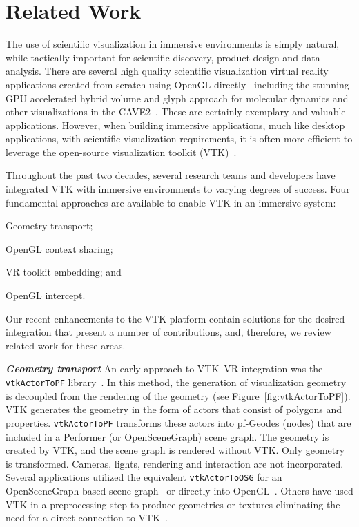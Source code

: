 \section{Related Work}

The use of scientific visualization in immersive environments is simply natural, while tactically important for scientific discovery, product design and data analysis.
There are several high quality scientific visualization virtual reality applications created from scratch using OpenGL directly~\cite{Billen:2008, LaViola:2007, Schulze:2001, Rantzau:1998} including the stunning GPU accelerated hybrid volume and glyph approach for molecular dynamics and other visualizations in the CAVE2~\cite{Reda:2013, Reda:2013a}.
These are certainly exemplary and valuable applications.
However, when building immersive applications, much like desktop applications, with scientific visualization requirements, it is often more efficient to leverage the open-source visualization toolkit (VTK)~\cite{Schroeder:2004}.

Throughout the past two decades, several research teams and developers have integrated VTK with immersive environments to varying degrees of success.
Four fundamental approaches are available to enable VTK in an immersive system:

\begin{compactitem}
\item Geometry transport;
\item OpenGL context sharing;
\item VR toolkit embedding; and
\item OpenGL intercept.
\end{compactitem}

Our recent enhancements to the VTK platform contain solutions for the desired integration that present a number of contributions, and, therefore, we review related work for these areas.

\textbf{\textit{Geometry transport}}
An early approach to VTK--VR integration was the \texttt{vtkActorToPF} library~\cite{Leigh98limbo/vtk}.
In this method, the generation of visualization geometry is decoupled from
the rendering of the geometry (see Figure~\ref{fig:vtkActorToPF}). 
VTK generates the geometry in the form of actors that consist of polygons and properties.
\texttt{vtkActorToPF} transforms these actors into pf-Geodes (nodes) that are included in a Performer (or OpenSceneGraph) scene graph. The geometry is created by VTK, and the scene graph is rendered without VTK. Only geometry is transformed. Cameras, lights, rendering and interaction are not incorporated. Several applications utilized the equivalent \texttt{vtkActorToOSG} for an OpenSceneGraph-based scene graph~\cite{VE-Suite:2016} or directly into OpenGL~\cite{Ohno:2006}. Others have used VTK in a preprocessing step to produce geometries or textures eliminating the need for a direct connection to VTK~\cite{Bivins:2005}.

